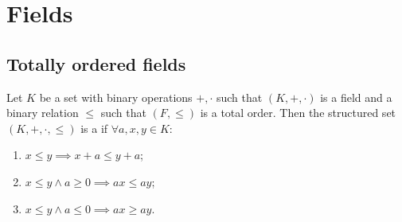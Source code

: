 \chapter{Fields}
\section{Totally ordered fields}
\begin{definition}
Let $K$ be a set with binary operations $+,\cdot$ such that $(K,+,\cdot)$ is a field and a binary relation $\leq$ such that $(F,\leq)$ is a total order. Then the structured set $(K,+,\cdot,\leq)$ is a  if $\forall a,x,y\in K$:
\begin{enumerate}
\item $x\leq y \implies x+a \leq y+a$;
\item $x\leq y \land a\geq 0 \implies ax \leq ay$;
\item $x\leq y \land a\leq 0 \implies ax \geq ay$.
\end{enumerate}
\end{definition}

